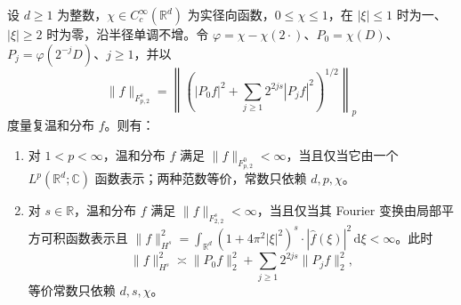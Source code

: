\begin{proposition}[非齐次平方范数的识别]
\label{b2:prop:19-inhomogeneous-identification}
设 \(d\geq1\) 为整数，\(\chi\in C_c^\infty(\mathbb R^d)\) 为实径向函数，\(0\leq\chi\leq1\)，在 \(|\xi|\leq1\) 时为一、\(|\xi|\geq2\) 时为零，沿半径单调不增。令 \(\varphi=\chi-\chi(2\cdot)\)、\(P_0=\chi(D)\)、\(P_j=\varphi(2^{-j}D)\)、\(j\geq1\)，并以
\[
 \|f\|_{F^s_{p,2}}
 =\left\|\left(|P_0f|^2+\sum_{j\geq1}2^{2js}|P_jf|^2\right)^{1/2}\right\|_p
\]
度量复温和分布 \(f\)。则有：
\begin{enumerate}
\item\label{b2:item:19-inhomogeneous-lp}
对 \(1<p<\infty\)，温和分布 \(f\) 满足 \(\|f\|_{F^0_{p,2}}<\infty\)，当且仅当它由一个 \(L^p(\mathbb R^d;\mathbb C)\) 函数表示；两种范数等价，常数只依赖 \(d,p,\chi\)。
\item\label{b2:item:19-inhomogeneous-hs}
对 \(s\in\mathbb R\)，温和分布 \(f\) 满足 \(\|f\|_{F^s_{2,2}}<\infty\)，当且仅当其 Fourier 变换由局部平方可积函数表示且
\(\|f\|_{H^s}^2=\int_{\mathbb R^d}(1+4\pi^2|\xi|^2)^s\cdot|\widehat f(\xi)|^2\,\mathrm d\xi<\infty\)。此时
\[
 \|f\|_{H^s}^2\asymp
 \|P_0f\|_2^2+\sum_{j\geq1}2^{2js}\|P_jf\|_2^2,
\]
等价常数只依赖 \(d,s,\chi\)。
\end{enumerate}
\end{proposition}
